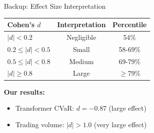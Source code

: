 \documentclass[aspectratio=169,11pt]{beamer}
\begin{document}
\begin{frame}{Backup: Effect Size Interpretation}
\begin{table}
\centering
\begin{tabular}{lcc}
\toprule
\textbf{Cohen's $d$} & \textbf{Interpretation} & \textbf{Percentile} \\
\midrule
$|d| < 0.2$ & Negligible & 54\% \\
$0.2 \leq |d| < 0.5$ & Small & 58-69\% \\
$0.5 \leq |d| < 0.8$ & Medium & 69-79\% \\
$|d| \geq 0.8$ & Large & $\geq$79\% \\
\bottomrule
\end{tabular}
\end{table}

\vspace{0.5cm}
\textbf{Our results:}
\begin{itemize}
    \item Transformer CVaR: $d = -0.87$ (large effect)
    \item Trading volume: $|d| > 1.0$ (very large effect)
\end{itemize}
\end{frame}
\end{document}
